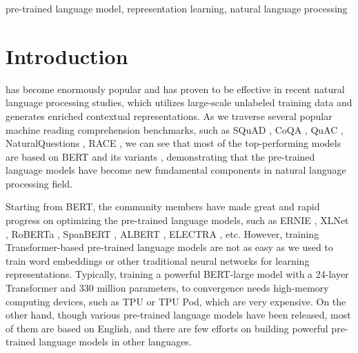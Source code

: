 \documentclass[journal]{IEEEtran}
\begin{document}
\begin{CJK*}{UTF8}{gbsn}
\begin{IEEEkeywords}
pre-trained language model, representation learning, natural language processing
\end{IEEEkeywords}


\newcommand\tcb[1]{\textcolor{blue}{#1}}

\IEEEpeerreviewmaketitle


\section{Introduction}
 \cite{devlin-etal-2019-bert} has become enormously popular and has proven to be effective in recent natural language processing studies, which utilizes large-scale unlabeled training data and generates enriched contextual representations.
As we traverse several popular machine reading comprehension benchmarks, such as SQuAD \cite{rajpurkar-etal-2018-know}, CoQA \cite{reddy2019coqa}, QuAC \cite{choi-etal-2018-quac}, NaturalQuestions \cite{kwiatkowski2019natural}, RACE \cite{lai-etal-2017}, we can see that most of the top-performing models are based on BERT and its variants \cite{dai-etal-2019-transformer,zhang2019dual,ran2019option}, demonstrating that the pre-trained language models have become new fundamental components in natural language processing field.

Starting from BERT, the community members have made great and rapid progress on optimizing the pre-trained language models, such as ERNIE \cite{sun2019ernie}, XLNet \cite{yang2019xlnet}, RoBERTa \cite{liu2019roberta}, SpanBERT \cite{joshi2019spanbert}, ALBERT \cite{lan2019albert}, ELECTRA \cite{clark2020electra}, etc. 
However, training Transformer-based \cite{vaswani2017attention} pre-trained language models are not as easy as we used to train word embeddings or other traditional neural networks for learning representations. 
Typically, training a powerful BERT-large model with a 24-layer Transformer and 330 million parameters, to convergence needs high-memory computing devices, such as TPU or TPU Pod, which are very expensive. 
On the other hand, though various pre-trained language models have been released, most of them are based on English, and there are few efforts on building powerful pre-trained language models in other languages. 


\end{CJK*}
\end{document}
